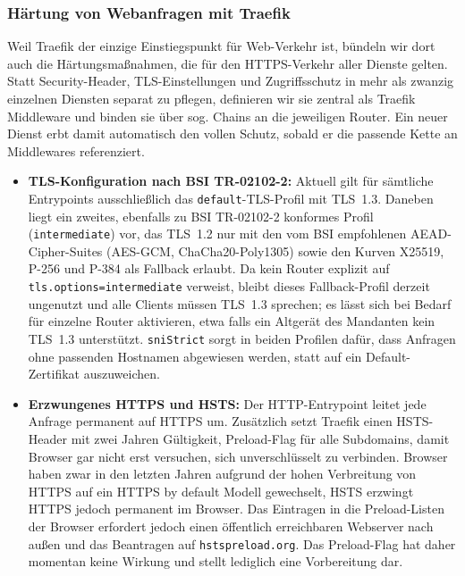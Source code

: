 \subsubsection{Härtung von Webanfragen mit Traefik}
Weil Traefik der einzige Einstiegspunkt für Web-Verkehr ist, bündeln wir dort
auch die Härtungsmaßnahmen, die für den \ac{HTTPS}-Verkehr aller Dienste gelten.
Statt Security-Header, \ac{TLS}-Einstellungen und Zugriffsschutz in mehr als zwanzig
einzelnen Diensten separat zu pflegen, definieren wir sie zentral als
Traefik Middleware und binden sie über sog. Chains an die
jeweiligen Router. Ein neuer Dienst erbt damit automatisch den vollen Schutz,
sobald er die passende Kette an Middlewares referenziert.

\begin{itemize}
  \item \textbf{\ac{TLS}-Konfiguration nach \ac{BSI} \ac{TR}-02102-2:} Aktuell gilt für
    sämtliche Entrypoints ausschließlich das \texttt{default}-\ac{TLS}-Profil mit
    \ac{TLS}~1.3. Daneben liegt ein zweites, ebenfalls zu \ac{BSI} \ac{TR}-02102-2 konformes
    Profil (\texttt{intermediate}) vor, das \ac{TLS}~1.2 nur mit den vom \ac{BSI}
    empfohlenen \ac{AEAD}-Cipher-Suites (AES-GCM, ChaCha20-Poly1305) sowie den Kurven
    X25519, P-256 und P-384 als Fallback erlaubt. Da kein Router explizit auf
    \texttt{tls.options=intermediate} verweist, bleibt dieses Fallback-Profil
    derzeit ungenutzt und alle Clients müssen \ac{TLS}~1.3 sprechen; es lässt sich
    bei Bedarf für einzelne Router aktivieren, etwa falls ein Altgerät des
    Mandanten kein \ac{TLS}~1.3 unterstützt. \texttt{sniStrict} sorgt in beiden
    Profilen dafür, dass Anfragen ohne passenden Hostnamen abgewiesen werden,
    statt auf ein Default-Zertifikat auszuweichen.
  \item \textbf{Erzwungenes \ac{HTTPS} und \ac{HSTS}:} Der \ac{HTTP}-Entrypoint leitet jede
    Anfrage permanent auf \ac{HTTPS} um. Zusätzlich setzt Traefik einen
    \ac{HSTS}-Header mit zwei Jahren Gültigkeit, Preload-Flag für alle
    Subdomains, damit Browser gar nicht erst versuchen, sich unverschlüsselt zu verbinden.
    Browser haben zwar in den letzten Jahren aufgrund der hohen Verbreitung von \ac{HTTPS} auf ein \ac{HTTPS} by default Modell gewechselt, \ac{HSTS} erzwingt \ac{HTTPS} jedoch permanent im Browser.
    Das Eintragen in die Preload-Listen der Browser erfordert jedoch einen öffentlich erreichbaren Webserver nach außen und das Beantragen auf \texttt{hstspreload.org}. Das Preload-Flag hat daher momentan keine Wirkung und stellt lediglich eine Vorbereitung dar.

\end{itemize}
